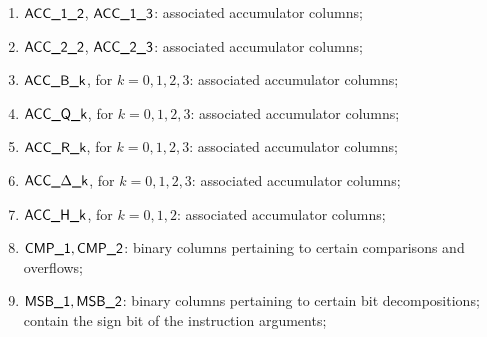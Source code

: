 \begin{enumerate}
	\item $\textsf{ACC}\textsf{\_1\_2}$, $\textsf{ACC}\textsf{\_1\_3}$:
		associated accumulator columns;
	\item $\textsf{ACC}\textsf{\_2\_2}$, $\textsf{ACC}\textsf{\_2\_3}$:
		associated accumulator columns;
	\item $\textsf{ACC}\textsf{\_B\_k}$, for $k=0,1,2,3$:
		associated accumulator columns;
	\item $\textsf{ACC}\textsf{\_Q\_k}$, for $k=0,1,2,3$:
		associated accumulator columns;
	\item $\textsf{ACC}\textsf{\_R\_k}$, for $k=0,1,2,3$:
		associated accumulator columns;
	\item $\textsf{ACC}\textsf{\_$\Delta$\_k}$, for $k=0,1,2,3$:
		associated accumulator columns;
	\item $\textsf{ACC}\textsf{\_H\_k}$, for $k=0,1,2$:
		associated accumulator columns;
	\item $\textsf{CMP\_1}, \textsf{CMP\_2}$:
		binary columns pertaining to certain comparisons and overflows;
	\item $\textsf{MSB\_1}, \textsf{MSB\_2}$:
		binary columns pertaining to certain bit decompositions;
	contain the sign bit of the instruction arguments;
\end{enumerate}
